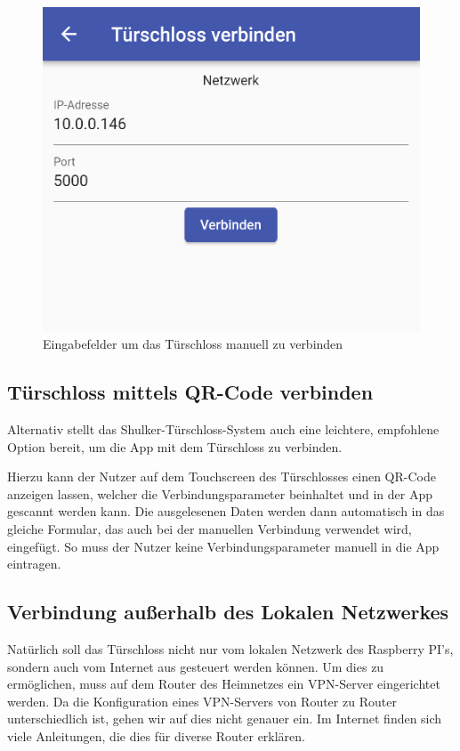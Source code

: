 \begin{figure}[H]
    \begin{center}
        \includegraphics[width=.5\textwidth]{images/mobile/ManualConnect.png}
        \caption{Eingabefelder um das Türschloss manuell zu verbinden}
    \end{center}
\end{figure}

\subsection{Türschloss mittels QR-Code verbinden}
Alternativ stellt das Shulker-Türschloss-System auch eine leichtere, empfohlene Option bereit, um die App mit dem Türschloss
zu verbinden.

Hierzu kann der Nutzer auf dem Touchscreen des Türschlosses einen QR-Code anzeigen lassen, welcher die Verbindungsparameter
beinhaltet und in der App gescannt werden kann. Die ausgelesenen Daten werden dann automatisch in das gleiche Formular,
das auch bei der manuellen Verbindung verwendet wird, eingefügt. So muss der Nutzer keine Verbindungsparameter manuell
in die App eintragen.

\subsection{Verbindung außerhalb des Lokalen Netzwerkes}
Natürlich soll das Türschloss nicht nur vom lokalen Netzwerk des Raspberry PI's, sondern auch vom Internet aus 
gesteuert werden können.
Um dies zu ermöglichen, muss auf dem Router des Heimnetzes ein VPN-Server eingerichtet werden.
Da die Konfiguration eines VPN-Servers von Router zu Router unterschiedlich ist, gehen wir auf dies nicht genauer ein.
Im Internet finden sich viele Anleitungen, die dies für diverse Router erklären.
\pagebreak
